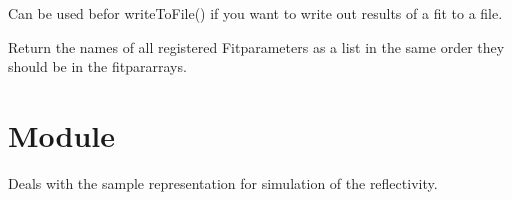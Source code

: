 \documentclass[letterpaper,10pt,english]{sphinxmanual}
\begin{document}
\begin{fulllineitems}
\begin{fulllineitems}
Can be used befor writeToFile() if you want to write out results of a fit to a file.

\end{fulllineitems}


\begin{fulllineitems}
\label{\detokenize{modules-api/parameters:Parameters.ParameterPool.getFitArrayLen}}
\end{fulllineitems}


\begin{fulllineitems}
\label{\detokenize{modules-api/parameters:Parameters.ParameterPool.getNames}}
Return the names of all registered Fitparameters as a list in the same order they should be in the fitpararrays.

\end{fulllineitems}


\end{fulllineitems}



\section{Module }
\label{\detokenize{modules-api/samplerepresentation:module-SampleRepresentation}}\label{\detokenize{modules-api/samplerepresentation:module-samplerepresentation}}\label{\detokenize{modules-api/samplerepresentation::doc}}
Deals with the sample representation for simulation of the reflectivity.
\end{document}
